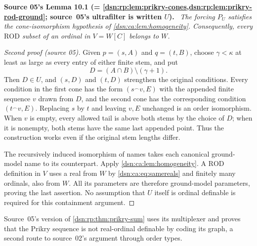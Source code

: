 \documentclass[11pt,a4paper]{article}
\numberwithin{equation}{section}
\theoremstyle{definition}
\theoremstyle{remark}
\newenvironment{dupstatement}[1]{\par\medskip\noindent\textbf{#1.}\ \begingroup\itshape\ignorespaces}{\endgroup\par\medskip}
\newcommand{\ROD}{\mathrm{ROD}}
\begin{document}
\begin{dupstatement}{Source 05's Lemma 10.1 (= \cref{dsn:rp:lem:prikry-cones,dsn:rp:lem:prikry-rod-ground}; source~05's ultrafilter is written $U$)}
The forcing $P_U$ satisfies the cone-isomorphism hypothesis of
\cref{dsn:ca:lem:homogeneity}. Consequently, every $\ROD$ subset of an ordinal
in $V=W[C]$ belongs to $W$.
\end{dupstatement}
\begin{proof}[Second proof (source 05)]
Given $p=(s,A)$ and $q=(t,B)$, choose $\gamma<\kappa$ at least as
large as every entry of either finite stem, and put
\[
 D=(A\cap B)\setminus(\gamma+1).
\]
Then $D\in U$, and $(s,D)$ and
$(t,D)$ strengthen the original conditions. Every condition in the
first cone has the form $(s\mathbin{{}^\frown}v,E)$ with the appended
finite sequence $v$ drawn from $D$, and the second cone has the
corresponding condition $(t\mathbin{{}^\frown}v,E)$. Replacing $s$ by
$t$ and leaving $v,E$ unchanged is an order isomorphism. When $v$ is
empty, every allowed tail is above both stems by the choice of $D$;
when it is nonempty, both stems have the same last appended point.
Thus the construction works even if the original stem lengths differ.

The recursively induced isomorphism of names takes each canonical
ground-model name to its counterpart. Apply
\cref{dsn:ca:lem:homogeneity}. A $\ROD$ definition in $V$ uses a real from
$W$ by \eqref{dsn:ca:eq:samereals} and finitely many ordinals, also from $W$.
All its parameters are therefore ground-model parameters, proving the
last assertion. No assumption that $U$ itself is ordinal definable
is required for this containment argument.
\end{proof}

Source~05's version of \cref{dsn:rp:thm:prikry-sum} uses its multiplexer and
proves that the Prikry sequence is not real-ordinal definable by coding its
graph, a second route to source~02's argument through order types.
\end{document}
